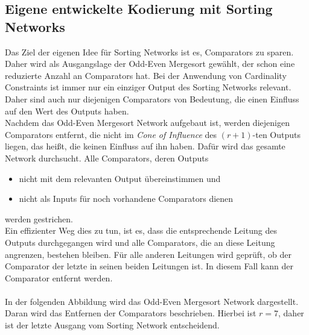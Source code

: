\documentclass[a4,abstract=on]{scrartcl}
\begin{document}
	\subsection{Eigene entwickelte Kodierung mit Sorting Networks}
Das Ziel der eigenen Idee für Sorting Networks ist es, Comparators zu sparen. Daher wird als Ausgangslage der Odd-Even Mergesort gewählt, der schon eine reduzierte Anzahl an Comparators hat. Bei der Anwendung von Cardinality Constraints ist immer nur ein einziger Output des Sorting Networks relevant. Daher sind auch nur diejenigen Comparators von Bedeutung, die einen Einfluss auf den Wert des Outputs haben.\\
Nachdem das Odd-Even Mergesort Network aufgebaut ist, werden diejenigen Comparators entfernt, die nicht im \textit{Cone of Influence} des $(r+1)$-ten Outputs liegen, das heißt, die keinen Einfluss auf ihn haben. Dafür wird das gesamte Network durchsucht. Alle Comparators, deren Outputs
\begin{itemize}
\item nicht mit dem relevanten Output übereinstimmen und
\item nicht als Inputs für noch vorhandene Comparators dienen
\end{itemize}
werden gestrichen. \\
Ein effizienter Weg dies zu tun, ist es, dass die entsprechende Leitung des Outputs durchgegangen wird und alle Comparators, die an diese Leitung angrenzen, bestehen bleiben. Für alle anderen Leitungen wird geprüft, ob der Comparator der letzte in seinen beiden Leitungen ist. In diesem Fall kann der Comparator entfernt werden.\\
\ \\
In der folgenden Abbildung wird das Odd-Even Mergesort Network dargestellt. Daran wird das Entfernen der Comparators beschrieben. Hierbei ist $r=7$, daher ist der letzte Ausgang vom Sorting Network entscheidend.
\end{document}
